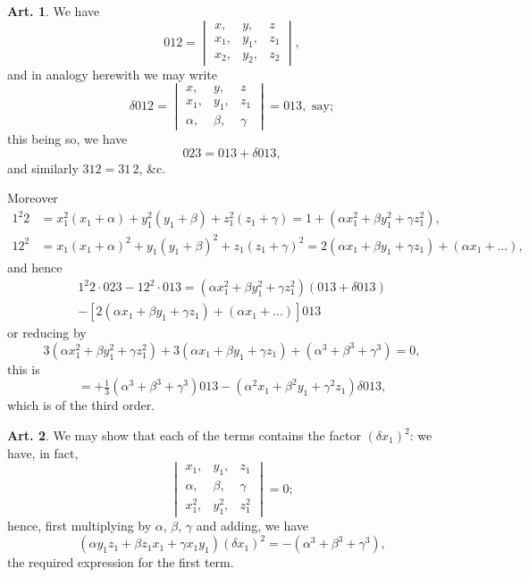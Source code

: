 \documentclass[12pt,a4paper]{article}
\theoremstyle{definition}
\newtheorem{art}{Art.}[section]
\begin{document}
\begin{art}\label{art:100}
We have
\[
012 = \begin{vmatrix} x, & y, & z \\ x_1, & y_1, & z_1 \\ x_2, & y_2, & z_2 \end{vmatrix},
\]
and in analogy herewith we may write
\[
\delta 012 = \begin{vmatrix} x, & y, & z \\ x_1, & y_1, & z_1 \\ \alpha, & \beta, & \gamma \end{vmatrix} = 013, \text{ say};
\]
this being so, we have
\[
023 = 013 + \delta 013,
\]
and similarly $312 = 31\,2$, \&c.

Moreover
\begin{align*}
1^2 2 &= x_1^2(x_1 + \alpha) + y_1^2(y_1 + \beta) + z_1^2(z_1 + \gamma) = 1 + (\alpha x_1^2 + \beta y_1^2 + \gamma z_1^2),\\
12^2 &= x_1(x_1 + \alpha)^2 + y_1(y_1 + \beta)^2 + z_1(z_1 + \gamma)^2 = 2(\alpha x_1 + \beta y_1 + \gamma z_1) + (\alpha x_1 + \ldots),
\end{align*}
and hence
\begin{multline*}
1^2 2 \cdot 023 - 12^2 \cdot 013 = (\alpha x_1^2 + \beta y_1^2 + \gamma z_1^2)(013 + \delta 013) \\
- [2(\alpha x_1 + \beta y_1 + \gamma z_1) + (\alpha x_1 + \ldots)]013
\end{multline*}
or reducing by
\[
3(\alpha x_1^2 + \beta y_1^2 + \gamma z_1^2) + 3(\alpha x_1 + \beta y_1 + \gamma z_1) + (\alpha^3 + \beta^3 + \gamma^3) = 0,
\]
this is
\[
= +\tfrac{1}{3}(\alpha^3 + \beta^3 + \gamma^3)013 - (\alpha^2 x_1 + \beta^2 y_1 + \gamma^2 z_1)\delta 013,
\]
which is of the third order.
\end{art}

\newpage
\begin{art}\label{art:101}
We may show that each of the terms contains the factor $(\delta x_1)^2$: we have, in fact,
\[
\begin{vmatrix} x_1, & y_1, & z_1 \\ \alpha, & \beta, & \gamma \\ x_1^2, & y_1^2, & z_1^2 \end{vmatrix} = 0;
\]
hence, first multiplying by $\alpha$, $\beta$, $\gamma$ and adding, we have
\[
(\alpha y_1 z_1 + \beta z_1 x_1 + \gamma x_1 y_1)(\delta x_1)^2 = -(\alpha^3 + \beta^3 + \gamma^3),
\]
the required expression for the first term.
\end{art}
\end{document}
